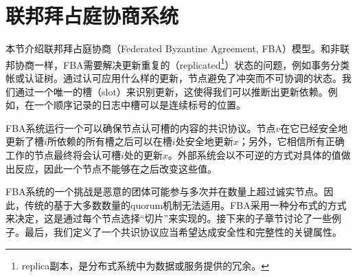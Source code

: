 \section{联邦拜占庭协商系统}\label{sec:fba}

本节介绍联邦拜占庭协商（Federated Byzantine Agreement, FBA）模型。和非联邦协商一样，FBA需要解决更新重复的（replicated\footnote{replica副本，是分布式系统中为数据或服务提供的冗余。}）状态的问题，例如事务分类帐或认证树。通过认可应用什么样的更新，节点避免了冲突而不可协调的状态。我们通过一个唯一的槽（slot）来识别更新，这使得我们可以推断出更新依赖。例如，在一个顺序记录的日志中槽可以是连续标号的位置。

FBA系统运行一个可以确保节点认可槽的内容的共识协议。节点$v$在它已经安全地更新了槽$i$所依赖的所有槽之后可以在槽$i$处安全地更新$x$；另外，它相信所有正确工作的节点最终将会认可槽$i$处的更新$x$。外部系统会以不可逆的方式对具体的值做出反应，因此一个节点不能够在之后改变这些值。

FBA系统的一个挑战是恶意的团体可能参与多次并在数量上超过诚实节点。因此，传统的基于大多数数量的quorum机制无法适用。FBA采用一种分布式的方式来决定{\quorum}，这是通过每个节点选择``{\quorum}切片''来实现的。接下来的子章节讨论了一些例子。最后，我们定义了一个共识协议应当希望达成安全性和完整性的关键属性。



